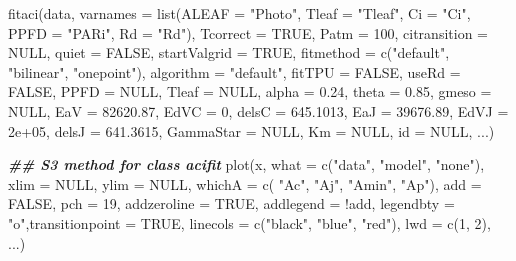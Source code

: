 \documentclass[
]{krantz}
\makeatletter
\newenvironment{Shaded}{\begin{snugshade}}{\end{snugshade}}
\newcommand{\AttributeTok}[1]{\textcolor[rgb]{0.77,0.63,0.00}{#1}}
\newcommand{\ConstantTok}[1]{\textcolor[rgb]{0.00,0.00,0.00}{#1}}
\newcommand{\DecValTok}[1]{\textcolor[rgb]{0.00,0.00,0.81}{#1}}
\newcommand{\DocumentationTok}[1]{\textcolor[rgb]{0.56,0.35,0.01}{\textbf{\textit{#1}}}}
\newcommand{\FloatTok}[1]{\textcolor[rgb]{0.00,0.00,0.81}{#1}}
\newcommand{\FunctionTok}[1]{\textcolor[rgb]{0.00,0.00,0.00}{#1}}
\newcommand{\NormalTok}[1]{#1}
\newcommand{\SpecialCharTok}[1]{\textcolor[rgb]{0.00,0.00,0.00}{#1}}
\newcommand{\StringTok}[1]{\textcolor[rgb]{0.31,0.60,0.02}{#1}}
\newenvironment{kframe}{%
\medskip{}
\setlength{\fboxsep}{.8em}
 \def\at@end@of@kframe{}%
 \ifinner\ifhmode%
  \def\at@end@of@kframe{\end{minipage}}%
  \begin{minipage}{\columnwidth}%
 \fi\fi%
 \def\FrameCommand##1{\hskip\@totalleftmargin \hskip-\fboxsep
 \colorbox{shadecolor}{##1}\hskip-\fboxsep
     \hskip-\linewidth \hskip-\@totalleftmargin \hskip\columnwidth}%
 \MakeFramed {\advance\hsize-\width
   \@totalleftmargin\z@ \linewidth\hsize
   \@setminipage}}%
 {\par\unskip\endMakeFramed%
 \at@end@of@kframe}
\renewenvironment{Shaded}{\begin{kframe}}{\end{kframe}}
\makeatother
\begin{document}
\begin{Shaded}
\begin{Highlighting}[]
\FunctionTok{fitaci}\NormalTok{(data, }\AttributeTok{varnames =} \FunctionTok{list}\NormalTok{(}\AttributeTok{ALEAF =} \StringTok{"Photo"}\NormalTok{, }
  \AttributeTok{Tleaf =} \StringTok{"Tleaf"}\NormalTok{, }\AttributeTok{Ci =} \StringTok{"Ci"}\NormalTok{, }\AttributeTok{PPFD =} \StringTok{"PARi"}\NormalTok{, }
  \AttributeTok{Rd =} \StringTok{"Rd"}\NormalTok{), }\AttributeTok{Tcorrect =} \ConstantTok{TRUE}\NormalTok{, }\AttributeTok{Patm =} \DecValTok{100}\NormalTok{, }
  \AttributeTok{citransition =} \ConstantTok{NULL}\NormalTok{, }\AttributeTok{quiet =} \ConstantTok{FALSE}\NormalTok{, }
  \AttributeTok{startValgrid =} \ConstantTok{TRUE}\NormalTok{, }\AttributeTok{fitmethod =} 
  \FunctionTok{c}\NormalTok{(}\StringTok{"default"}\NormalTok{, }\StringTok{"bilinear"}\NormalTok{, }\StringTok{"onepoint"}\NormalTok{), }
  \AttributeTok{algorithm =} \StringTok{"default"}\NormalTok{, }\AttributeTok{fitTPU =} \ConstantTok{FALSE}\NormalTok{, }
  \AttributeTok{useRd =} \ConstantTok{FALSE}\NormalTok{, }\AttributeTok{PPFD =} \ConstantTok{NULL}\NormalTok{, }\AttributeTok{Tleaf =} \ConstantTok{NULL}\NormalTok{, }
  \AttributeTok{alpha =} \FloatTok{0.24}\NormalTok{, }\AttributeTok{theta =} \FloatTok{0.85}\NormalTok{, }\AttributeTok{gmeso =} \ConstantTok{NULL}\NormalTok{, }
  \AttributeTok{EaV =} \FloatTok{82620.87}\NormalTok{, }\AttributeTok{EdVC =} \DecValTok{0}\NormalTok{, }\AttributeTok{delsC =} \FloatTok{645.1013}\NormalTok{,}
  \AttributeTok{EaJ =} \FloatTok{39676.89}\NormalTok{, }\AttributeTok{EdVJ =} \FloatTok{2e+05}\NormalTok{, }
  \AttributeTok{delsJ =} \FloatTok{641.3615}\NormalTok{, }\AttributeTok{GammaStar =} \ConstantTok{NULL}\NormalTok{, }
  \AttributeTok{Km =} \ConstantTok{NULL}\NormalTok{, }\AttributeTok{id =} \ConstantTok{NULL}\NormalTok{, ...)}

\DocumentationTok{\#\# S3 method for class \textquotesingle{}acifit\textquotesingle{}}
\FunctionTok{plot}\NormalTok{(x, }\AttributeTok{what =} \FunctionTok{c}\NormalTok{(}\StringTok{"data"}\NormalTok{, }\StringTok{"model"}\NormalTok{, }\StringTok{"none"}\NormalTok{),}
     \AttributeTok{xlim =} \ConstantTok{NULL}\NormalTok{, }\AttributeTok{ylim =} \ConstantTok{NULL}\NormalTok{, }\AttributeTok{whichA =} \FunctionTok{c}\NormalTok{(}
       \StringTok{"Ac"}\NormalTok{, }\StringTok{"Aj"}\NormalTok{, }\StringTok{"Amin"}\NormalTok{, }\StringTok{"Ap"}\NormalTok{), }\AttributeTok{add =} \ConstantTok{FALSE}\NormalTok{,}
\AttributeTok{pch =} \DecValTok{19}\NormalTok{, }\AttributeTok{addzeroline =} \ConstantTok{TRUE}\NormalTok{, }\AttributeTok{addlegend =} 
  \SpecialCharTok{!}\NormalTok{add, }\AttributeTok{legendbty =} \StringTok{"o"}\NormalTok{,}\AttributeTok{transitionpoint =} \ConstantTok{TRUE}\NormalTok{, }
\AttributeTok{linecols =} \FunctionTok{c}\NormalTok{(}\StringTok{"black"}\NormalTok{, }\StringTok{"blue"}\NormalTok{, }\StringTok{"red"}\NormalTok{), }\AttributeTok{lwd =} \FunctionTok{c}\NormalTok{(}\DecValTok{1}\NormalTok{,}
\DecValTok{2}\NormalTok{), ...)}
\end{Highlighting}
\end{Shaded}
\end{document}
